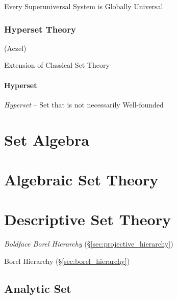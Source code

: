Every Superuniversal System is Globally Universal



\subsubsection{Hyperset Theory}\label{sec:hyperset_theory}

(Aczel)

Extension of Classical Set Theory




\paragraph{Hyperset}\label{sec:hyperset}\hfill

\emph{Hyperset} -- Set that is not necessarily Well-founded



\section{Set Algebra}\label{sec:set_algebra}

\section{Algebraic Set Theory}\label{sec:algebraic_set_theory}

\section{Descriptive Set Theory}\label{sec:descriptive_set_theory}

\emph{Boldface Borel Hierarchy} (\S\ref{sec:projective_hierarchy})

Borel Hierarchy (\S\ref{sec:borel_hierarchy})



\subsection{Analytic Set}\label{sec:analytic_set}

